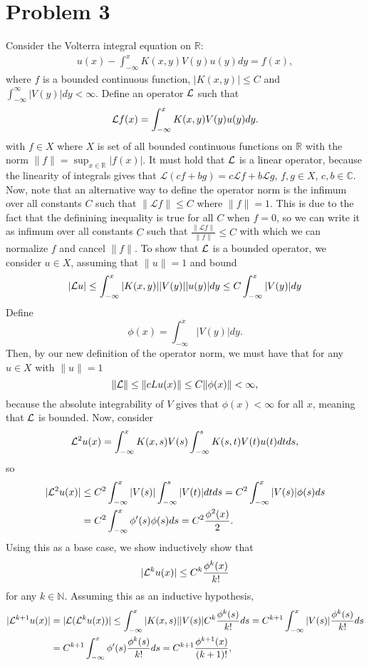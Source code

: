 \documentclass{article}
\begin{document}
\section{Problem 3}
Consider the Volterra integral equation on $\mathbb R$:
  \begin{align*}
    u(x) - \int_{-\infty}^x K(x,y) V(y) u(y) d y = f(x),
  \end{align*}
  where $f$ is a bounded continuous function, $|K(x,y)| \leq C$ and $\int_{-\infty}^\infty|V(y)| d y < \infty$. Define an operator ${\cal L}$ such that
\[
{\cal L} f(x)=\int_{-\infty}^x K(x,y) V(y) u(y) d y.
\]
with $f\in X$ where $X$ is set of all bounded continuous functions on $\mathbb R$ with the norm $\|f\| = \sup_{x \in \mathbb R}|f(x)|$. It must hold that ${\cal L}$ is a linear operator, because the linearity of integrals gives that $\mathcal L (cf + bg) = c\mathcal L f + b\mathcal L g$, $f,g \in X$, $c,b \in \mathbb C$. Now, note that an alternative way to define the operator norm is the infimum over all constants $C$ such that $\|\mathcal L f\| \leq C$ where $\|f\|=1$. This is due to the fact that the definining inequality is true for all $C$ when $f=0$, so we can write it as infimum over all constants $C$ such that $\frac{\|\mathcal L f\|}{\|f\|} \leq C$ with which we can normalize $f$ and cancel $\|f\|$. To show that ${\cal L}$ is a bounded operator, we consider $u\in X$, assuming that $\|u\|=1$ and bound
\begin{align*}
|{\cal L} u|\leq\int_{-\infty}^x|K(x,y)| |V(y)| |u(y)| d y\leq C\int_{-\infty}^x |V(y)|dy
\end{align*}
Define 
\[
\phi(x)=\int_{-\infty}^x |V(y)|dy. 
\]
Then, by our new definition of the operator norm, we must have that for any $u\in X$ with $\|u\|=1$
\[
\|{\cal L}\|\leq\|cL u(x)\|\leq C\|\phi(x)\|<\infty,
\]
because the absolute integrability of $V$ gives that $\phi(x)<\infty$ for all $x$,
meaning that ${\cal L}$ is bounded. Now, consider 
\[
{\cal L}^2u(x)=\int_{-\infty}^x K(x,s)V(s)\int_{-\infty}^s K(s,t)V(t)u(t)dtds,
\]
so 
\begin{align*}
|{\cal L}^2u(x)|&\leq C^2\int_{-\infty}^x |V(s)|\int_{-\infty}^s|V(t)|dtds=C^2\int_{-\infty}^x|V(s)|\phi(s)ds\\&=C^2\int_{-\infty}^x\phi'(s)\phi(s)ds=C^2\frac{\phi^2(x)}{2}.
\end{align*}
Using this as a base case, we show inductively show that 
\[
|{\cal L}^ku(x)|\leq C^k\frac{\phi^k(x)}{k!}
\]
for any $k\in\mathbb{N}$. Assuming this as an inductive hypothesis, 
\begin{align*}
|{\cal L}^{k+1}u(x)|&=|{\cal L}({\cal L}^ku(x))|\leq \int_{-\infty}^x |K(x,s)||V(s)|C^k\frac{\phi^k(s)}{k!}ds=C^{k+1}\int_{-\infty}^x|V(s)|\frac{\phi^k(s)}{k!}ds\\&=C^{k+1}\int_{-\infty}^x\phi'(s)\frac{\phi^k(s)}{k!}ds=C^{k+1}\frac{\phi^{k+1}(x)}{(k+1)!},
\end{align*}
\end{document}
